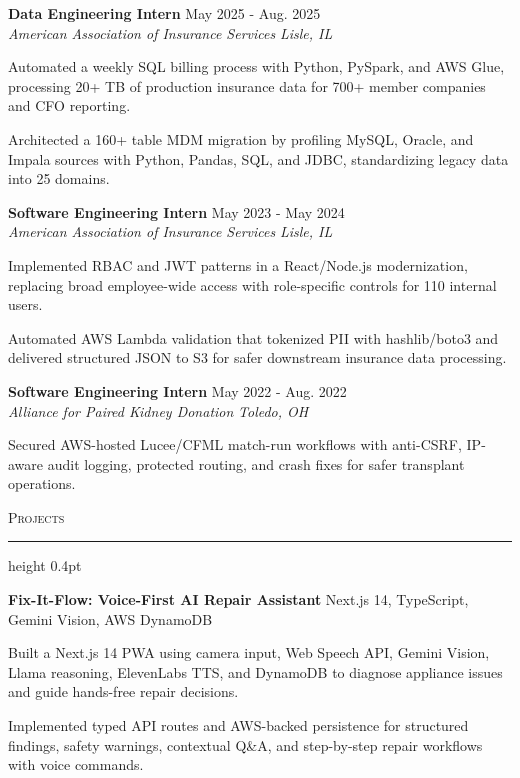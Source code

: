 \documentclass[letterpaper,11pt]{article}
\newcommand{\resumesection}[1]{%
  \par\vspace{2pt}%
  {\large\scshape #1}\par\vspace{2pt}%
  \hrule height 0.4pt\vspace{2pt}%
}
\newcommand{\resumeSubheading}[4]{
  \textbf{#1} \hfill #2\\
  \textit{#3} \hfill \textit{#4}
}
\newcommand{\projectHeading}[2]{
  \textbf{#1} \hfill #2
}
\begin{document}
\resumeSubheading
{Data Engineering Intern}{May 2025 - Aug. 2025}
{American Association of Insurance Services}{Lisle, IL}
\begin{tightitemize}
  \item Automated a weekly SQL billing process with Python, PySpark, and AWS Glue, processing 20+ TB of production insurance data for 700+ member companies and CFO reporting.
  \item Architected a 160+ table MDM migration by profiling MySQL, Oracle, and Impala sources with Python, Pandas, SQL, and JDBC, standardizing legacy data into 25 domains.
\end{tightitemize}

\resumeSubheading
{Software Engineering Intern}{May 2023 - May 2024}
{American Association of Insurance Services}{Lisle, IL}
\begin{tightitemize}
  \item Implemented RBAC and JWT patterns in a React/Node.js modernization, replacing broad employee-wide access with role-specific controls for 110 internal users.
  \item Automated AWS Lambda validation that tokenized PII with hashlib/boto3 and delivered structured JSON to S3 for safer downstream insurance data processing.
\end{tightitemize}

\resumeSubheading
{Software Engineering Intern}{May 2022 - Aug. 2022}
{Alliance for Paired Kidney Donation}{Toledo, OH}
\begin{tightitemize}
  \item Secured AWS-hosted Lucee/CFML match-run workflows with anti-CSRF, IP-aware audit logging, protected routing, and crash fixes for safer transplant operations.
\end{tightitemize}

\resumesection{Projects}
\projectHeading{Fix-It-Flow: Voice-First AI Repair Assistant}{Next.js 14, TypeScript, Gemini Vision, AWS DynamoDB}
\begin{tightitemize}
  \item Built a Next.js 14 PWA using camera input, Web Speech API, Gemini Vision, Llama reasoning, ElevenLabs TTS, and DynamoDB to diagnose appliance issues and guide hands-free repair decisions.
  \item Implemented typed API routes and AWS-backed persistence for structured findings, safety warnings, contextual Q\&A, and step-by-step repair workflows with voice commands.
\end{tightitemize}
\end{document}
